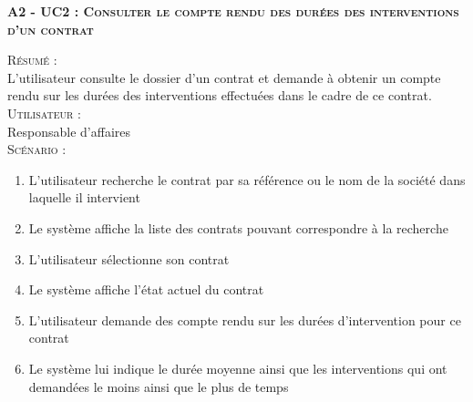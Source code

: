 \noindent\textsc{\bf{A2 - UC2 :} Consulter le compte rendu des durées des interventions d’un contrat}
\begin{shaded}
\noindent\textsc{Résumé :}\\

L’utilisateur consulte le dossier d’un contrat et demande à obtenir un compte rendu sur les durées des interventions effectuées dans le cadre de ce contrat. \\

\noindent\textsc{Utilisateur :}\\

Responsable d’affaires \\

\noindent\textsc{Scénario :} \\
\begin{enumerate}
    \item L’utilisateur recherche le contrat par sa référence ou le nom de la société dans laquelle il intervient
    \item Le système affiche la liste des contrats pouvant correspondre à la recherche
    \item L’utilisateur sélectionne son contrat
    \item Le système affiche l’état actuel du contrat
    \item L’utilisateur demande des compte rendu sur les durées d’intervention pour ce contrat
    \item Le système lui indique le durée moyenne ainsi que les interventions qui ont demandées le moins ainsi que le plus de temps
\end{enumerate}
\end{shaded}


